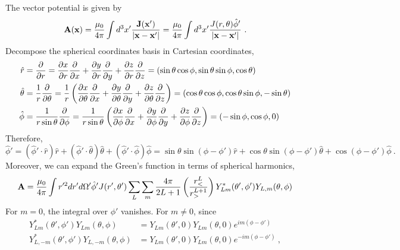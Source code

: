 \documentclass[12pt]{article}
\newcommand{\x}{{\bf x}}
\newcommand{\A}{{\bf A}}
\begin{document}
\newpage
{} The vector potential is given by
\begin{equation}
    \A(\x) = \frac{\mu_0}{4\pi}\int d^3 x' \frac{{\bf J}(\x')}{|\x - \x'|} = \frac{\mu_0}{4\pi} \int d^3 x' \frac{J(r, \theta) \hat{\phi}'}{|\x - \x'|}~.
\end{equation}
Decompose the spherical coordinates basis in Cartesian coordinates,
\begin{align}
    \hat{r} &= \frac{\partial}{\partial r} = \frac{\partial x}{\partial r} \frac{\partial }{\partial x} + \frac{\partial y}{\partial r} \frac{\partial }{\partial y}+ \frac{\partial z}{\partial r} \frac{\partial }{\partial z} = (\sin \theta \cos \phi, \sin \theta \sin \phi, \cos \theta)\\
    \hat{\bf \theta} &= \frac{1}{r}\frac{\partial}{\partial \theta} = \frac{1}{r}\left(\frac{\partial x}{\partial \theta} \frac{\partial }{\partial x} + \frac{\partial y}{\partial \theta} \frac{\partial }{\partial y}+ \frac{\partial z}{\partial \theta} \frac{\partial }{\partial z}\right) = (\cos \theta \cos \phi, \cos \theta \sin \phi, -\sin \theta)\\
    \hat{\phi} &= \frac{1}{r\sin\theta} \frac{\partial}{\partial \phi} =\frac{1}{r \sin \theta}\left(\frac{\partial x}{\partial \phi} \frac{\partial }{\partial x} + \frac{\partial y}{\partial \phi} \frac{\partial }{\partial y}+ \frac{\partial z}{\partial \phi} \frac{\partial }{\partial z}\right) = (-\sin \phi, \cos \phi, 0)
\end{align}
Therefore,
\begin{equation}
    \hat{\phi}' = (\hat{\phi}' \cdot \hat{r} )\hat{r} + (\hat{\phi}' \cdot \hat{\theta})\hat{\theta} + (\hat{\phi}' \cdot \hat{\phi}) \hat{\phi} = \sin \theta \sin(\phi - \phi') \hat{r} + \cos\theta \sin(\phi - \phi')\hat{\theta} + \cos(\phi - \phi') \hat{\phi}~.
\end{equation}
Moreover, we can expand the Green's function in terms of spherical harmonics,
\begin{equation}
    \A = \frac{\mu_0}{4\pi} \int r'^2 dr' d\Omega' \hat{\phi}'J(r', \theta') \sum_{L}\sum_{m} \frac{4\pi}{2L+1}\left(\frac{r_<^L}{r_>^{L+1}}\right) Y_{Lm}^*(\theta', \phi') Y_{L,m}(\theta, \phi)
\end{equation}
For $m = 0$, the integral over $\phi'$ vanishes. For $m \neq 0$,
since
\begin{align}
    Y_{Lm}^*(\theta', \phi')Y_{Lm}(\theta, \phi) &= Y_{Lm}(\theta',0)Y_{Lm}(\theta,0)e^{im(\phi - \phi')}\\
    Y_{L,-m}^*(\theta', \phi')Y_{L,-m}(\theta, \phi) &= Y_{Lm}(\theta',0)Y_{Lm}(\theta,0)e^{-im(\phi - \phi')}~,
\end{align}
\end{document}
